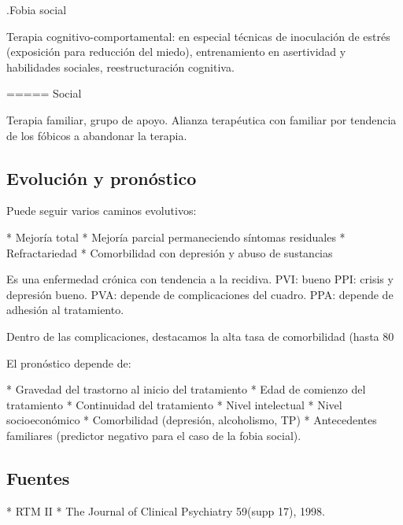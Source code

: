.Fobia social

Terapia cognitivo-comportamental: en especial técnicas de inoculación de estrés (exposición para reducción del miedo), entrenamiento en asertividad y habilidades sociales, reestructuración cognitiva.

===== Social

Terapia familiar, grupo de apoyo. Alianza terapéutica con familiar por tendencia de los fóbicos a abandonar la terapia.

\subsection*{Evolución y pronóstico}

Puede seguir varios caminos evolutivos:

* Mejoría total
* Mejoría parcial permaneciendo síntomas residuales
* Refractariedad
* Comorbilidad con depresión y abuso de sustancias

Es una enfermedad crónica con tendencia a la recidiva. PVI: bueno PPI: crisis y depresión bueno. PVA: depende de complicaciones del cuadro. PPA: depende de adhesión al tratamiento.

Dentro de las complicaciones, destacamos la alta tasa de comorbilidad (hasta 80%

El pronóstico depende de:

* Gravedad del trastorno al inicio del tratamiento
* Edad de comienzo del tratamiento
* Continuidad del tratamiento
* Nivel intelectual
* Nivel socioeconómico
* Comorbilidad (depresión, alcoholismo, TP)
* Antecedentes familiares (predictor negativo para el caso de la fobia social).

\subsection*{Fuentes}

* RTM II
* The Journal of Clinical Psychiatry 59(supp 17), 1998.
